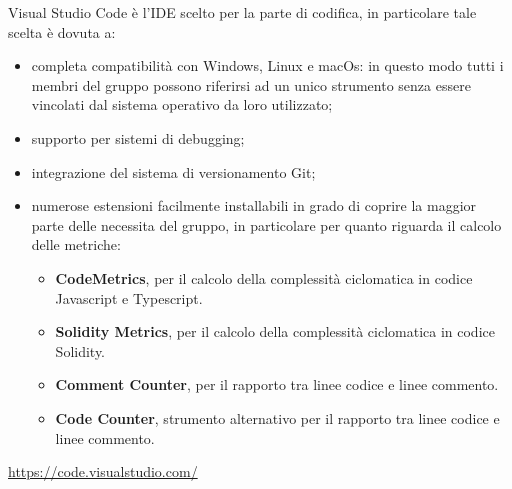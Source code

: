 	Visual Studio Code è l'IDE scelto per la parte di codifica, in particolare tale scelta è dovuta a:
	\begin{itemize}
		\item completa compatibilità con Windows, Linux e macOs: in questo modo tutti i membri del gruppo possono riferirsi ad un unico strumento senza essere vincolati dal sistema operativo da loro utilizzato;
		\item supporto per sistemi di debugging;
		\item integrazione del sistema di versionamento Git;
		\item numerose estensioni facilmente installabili in grado di coprire la maggior parte delle necessita del gruppo, in particolare per quanto riguarda il calcolo delle metriche:
		\begin{itemize}
			\item \textbf{CodeMetrics}, per il calcolo della complessità ciclomatica in codice Javascript e Typescript.
			\item \textbf{Solidity Metrics}, per il calcolo della complessità ciclomatica in codice Solidity.
			\item \textbf{Comment Counter}, per il rapporto tra linee codice e linee commento.
			\item \textbf{Code Counter}, strumento alternativo per il rapporto tra linee codice e linee commento.
		\end{itemize}
	\end{itemize}
	\begin{center}
		\url{https://code.visualstudio.com/}
	\end{center}
